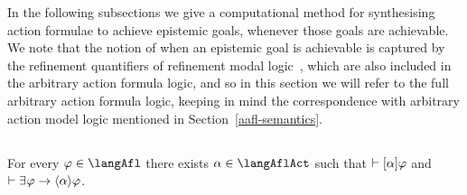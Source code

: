 In the following subsections we give a computational method for synthesising action formulae to achieve epistemic goals, whenever those goals are achievable.
We note that the notion of when an epistemic goal is achievable is captured by the refinement quantifiers of refinement modal logic~\cite{vanditmarsch:2009,bozzelli:2014b}, which are also included in the arbitrary action formula logic, and so in this section we will refer to the full arbitrary action formula logic, keeping in mind the correspondence with arbitrary action model logic mentioned in Section~\ref{aafl-semantics}.

\subsection{\classK{}}

\begin{proposition}\label{afl-k-synthesis}
For every $\phi \in \langAfl$ there exists $\alpha \in \langAflAct$ such that $\vdash {[ {\alpha} ]} \varphi$ and $\proves \somerefs \phi \implies \actionE{\alpha} \phi$.
\end{proposition}

